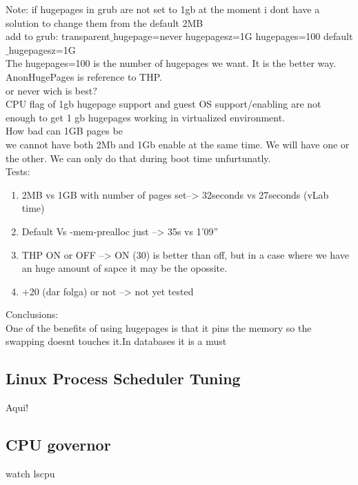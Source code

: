 \documentclass[11pt, a4paper, oneside]{article}
\theoremstyle{definition}
\begin{document}
Note: if hugepages in grub are not set to 1gb at the moment i dont have a solution to change them from the default 2MB\\
add to grub: transparent$\_$hugepage=never hugepagesz=1G hugepages=100 default$\_$hugepagesz=1G\\
The hugepages=100 is the number of hugepages we want. It is the better way.\\
AnonHugePages is reference to THP.\\

or never wich is best?\\
CPU flag of 1gb hugepage support and guest OS support/enabling are not enough to get 1 gb hugepages working in virtualized environment. \\
How bad can 1GB pages be\\

we cannot have both 2Mb and 1Gb enable at the same time. We will have one or the other. We can only do that during boot time unfurtunatly.\\

Tests:\\
\begin{enumerate}
	\item 2MB vs 1GB with number of pages set--> 32seconds vs 27seconds (vLab time)
	\item Default Vs -mem-prealloc just --> 35s vs 1'09''
	\item THP ON or OFF --> ON (30) is better than off, but in a case where we have an huge amount of sapce it may be the opossite.\\
	\item +20 (dar folga) or not --> not yet tested
\end{enumerate}
Conclusions:\\

One of the benefits of using hugepages is that it pins the memory so the swapping doesnt touches it.In databases it is a must\\  


\subsection{Linux Process Scheduler Tuning}

Aqui!


\subsection{CPU governor}
watch lscpu\\
\end{document}
